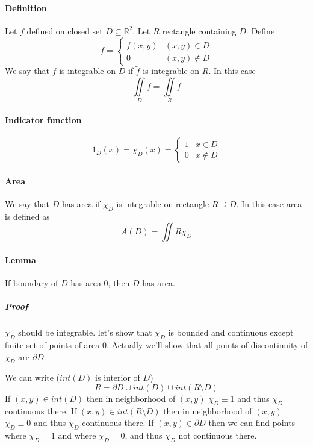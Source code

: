 \paragraph{Definition}
Let $f$ defined on closed set $D \subseteq \mathbb{R}^2$. Let $R$ rectangle containing $D$. Define
$$f = \begin{cases}
\tilde{f}(x,y)&(x,y)\in D\\
0&(x,y)\not\in D
\end{cases}$$ 
We say that $f$ is integrable on $D$ if $\tilde{f}$ is integrable on $R$. In this case
$$\iint\limits_{D} f = \iint\limits_{R} \tilde{f}$$
\paragraph{Indicator function}
$$1_D(x) = \chi_D(x) = \begin{cases}
1&x\in D\\0&x\not \in D
\end{cases}$$
\paragraph{Area}
We say that $D$ has area if $\chi_D$ is integrable on rectangle $R\supseteq D$. In this case area is defined as
$$A(D) = \iint\limits{R} \chi_D$$
\paragraph{Lemma}
If boundary of $D$ has area 0, then $D$ has area.
\subparagraph{Proof}
$\chi_D$ should be integrable. let's show that $\chi_D$ is bounded and continuous except finite set of points of area 0. Actually we'll show that all points of discontinuity of $\chi_D$ are $\partial D$. 

We can write ($int(D)$ is interior of $D$)
$$R = \partial D \cup int(D) \cup int(R\setminus D)$$
If $(x,y)\in int(D)$ then in neighborhood of $(x,y)$ $\chi_D \equiv 1$  and thus $\chi_D$ continuous there.
If $(x,y)\in int(R\setminus D)$ then in neighborhood of $(x,y)$ $\chi_D \equiv 0$  and thus $\chi_D$ continuous there.
If $(x,y)\in \partial D$ then we can find points where $\chi_D = 1$ and where $\chi_D = 0$, and thus $\chi_D$ not continuous there. 
